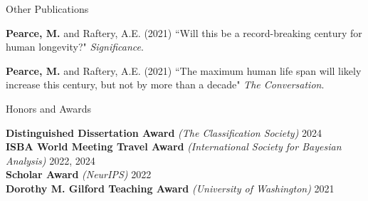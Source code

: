 \documentclass{resume} %
\begin{document}
\begin{rSection}{Other Publications}

\textbf{Pearce, M.} and Raftery, A.E. (2021) ``Will this be a record-breaking century for human longevity?" {\em Significance}.

\textbf{Pearce, M.} and Raftery, A.E. (2021) ``The maximum human life span will likely increase this century, but not by more than a decade" {\em The Conversation}.

\end{rSection}


\begin{rSection}{Honors and Awards}

\textbf{Distinguished Dissertation Award} {\it (The Classification Society)} \hfill {2024}
\\ \textbf{ISBA World Meeting Travel Award} {\it (International Society for Bayesian Analysis)} \hfill {2022, 2024}
\\ \textbf{Scholar Award} {\it (NeurIPS)} \hfill {2022}
\\ \textbf{Dorothy M. Gilford Teaching Award} {\it (University of Washington)} \hfill {2021}

\end{rSection}
\end{document}
